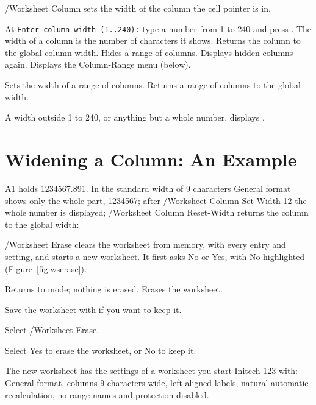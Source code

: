/Worksheet Column sets the width of the column the cell pointer is in.
\begin{Options}
 At \texttt{Enter column width (1..240):} type a number
  from 1 to 240 and press .  The width of a column is the
  number of characters it shows.
 Returns the column to the global column width.
 Hides a range of columns.
 Displays hidden columns again.
 Displays the Column-Range menu (below).
\end{Options}
\begin{Options}
 Sets the width of a range of
  columns.
 Returns a range of columns to the
  global width.
\end{Options}
\begin{Note}
A width outside 1 to 240, or anything but a whole number, displays
.
\end{Note}

\section{Widening a Column: An Example}
A1 holds 1234567.891.  In the standard width of 9 characters General
format shows only the whole part, 1234567; after /Worksheet Column
Set-Width 12 the whole number is displayed; /Worksheet Column Reset-Width
returns the column to the global width:


/Worksheet Erase clears the worksheet from memory, with every entry and
setting, and starts a new worksheet.  It first asks No or Yes, with No
highlighted (Figure~\ref{fig:wserase}).
\begin{Options}
 Returns to  mode; nothing is erased.
 Erases the worksheet.
\end{Options}

\begin{Steps123}
\item Save the worksheet with  if you want to keep it.
\item Select /Worksheet Erase.
\item Select Yes to erase the worksheet, or No to keep it.
\end{Steps123}
The new worksheet has the settings of a worksheet you start Initech 123
with: General format, columns 9 characters wide, left-aligned labels,
natural automatic recalculation, no range names and protection disabled.

